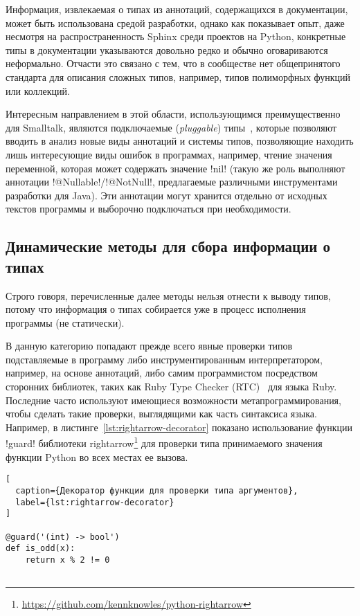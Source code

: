 Информация, извлекаемая о типах из аннотаций, содержащихся в
документации, может быть использована средой разработки, однако как показывает
опыт, даже несмотря на распространенность Sphinx среди проектов на Python,
конкретные типы в документации указываются довольно редко и обычно оговариваются
неформально.  Отчасти это связано с тем, что в сообществе нет общепринятого
стандарта для описания сложных типов, например, типов полиморфных функций или
коллекций.

Интересным направлением в этой области, использующимся преимущественно для
Smalltalk, являются подключаемые (\emph{pluggable}) типы~\cite{Haldiman2009},
которые позволяют вводить в анализ новые виды аннотаций и системы типов,
позволяющие находить лишь интересующие виды ошибок в программах, например,
чтение значения переменной, которая может содержать значение !nil! (такую же
роль выполняют аннотации !@Nullable!/!@NotNull!, предлагаемые различными инструментами
разработки для Java). Эти аннотации могут хранится отдельно от исходных текстов
программы и выборочно подключаться при необходимости.


\subsection{Динамические методы для сбора информации о типах}
\label{sec:dynamic-checks}

Строго говоря, перечисленные далее методы нельзя отнести к выводу типов, потому
что информация о типах собирается уже в процесс исполнения программы (не
статически).

В данную категорию попадают прежде всего явные проверки типов подставляемые в
программу либо инструментированным интерпретатором, например, на основе
аннотаций, либо самим программистом посредством сторонних библиотек, таких как
Ruby Type Checker (RTC)~\cite{Ren2013} для языка Ruby. Последние часто
используют имеющиеся возможности метапрограммирования, чтобы сделать такие проверки,
выглядящими как часть синтаксиса языка. Например, в
листинге~\ref{lst:rightarrow-decorator} показано использование функции !guard!
библиотеки
rightarrow\footnote{\url{https://github.com/kennknowles/python-rightarrow}}
для проверки типа принимаемого значения функции Python во всех местах
ее вызова.

\begin{lstlisting}[
  caption={Декоратор функции для проверки типа аргументов},
  label={lst:rightarrow-decorator}
]

@guard('(int) -> bool')
def is_odd(x):
    return x % 2 != 0
    
\end{lstlisting}



